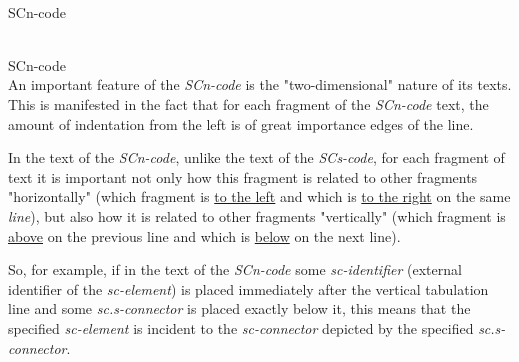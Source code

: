 \begin{frame}{\\SCn-code}
\topline
\justifying
\vspace*{\fill}\\
\small
\begin{SCn}
	
\end{SCn}
\end{frame}
	
\begin{frame}{\\SCn-code}
	\topline
	\justifying
	\vspace*{\fill}\\
	An important feature of the \textit{SCn-code} is the "two-dimensional"{} nature of its texts. This is manifested in the fact that for each fragment of the \textit{SCn-code} text, the amount of indentation from the left is of great importance
	edges of the line.
	
	In the text of the \textit{SCn-code}, unlike the text of the \textit{SCs-code}, for each fragment of text it is important not only how this fragment is related to other fragments "horizontally"{} (which fragment is \underline{to the left} and which is \underline{to the right} on the same \textit{line}), but also how it is related to other fragments "vertically"{} (which fragment is \underline{above} on the previous line and which is \underline{below} on the next line).
	
	So, for example, if in the text of the \textit{SCn-code} some \textit{sc-identifier} (external identifier of the \textit{sc-element}) is placed immediately after the vertical tabulation line and some \textit{sc.s-connector} is placed exactly below it, this means that the specified \textit{sc-element} is incident to the \textit{sc-connector} depicted by the specified \textit{sc.s-connector}.
\end{frame}

